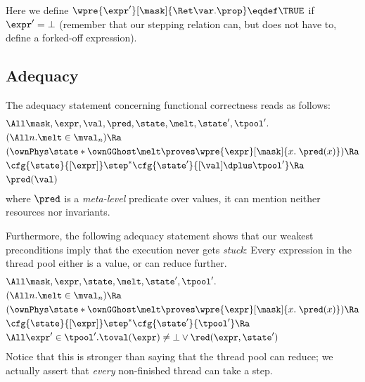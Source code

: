 Here we define $\wpre{\expr'}[\mask]{\Ret\var.\prop} \eqdef \TRUE$ if $\expr' = \bot$ (remember that our stepping relation can, but does not have to, define a forked-off expression).

\subsection{Adequacy}

The adequacy statement concerning functional correctness reads as follows:
\begin{align*}
 &\All \mask, \expr, \val, \pred, \state, \melt, \state', \tpool'.
 \\&(\All n. \melt \in \mval_n) \Ra
 \\&( \ownPhys\state * \ownGGhost\melt \proves \wpre{\expr}[\mask]{x.\; \pred(x)}) \Ra
 \\&\cfg{\state}{[\expr]} \step^\ast
     \cfg{\state'}{[\val] \dplus \tpool'} \Ra
     \\&\pred(\val)
\end{align*}
where $\pred$ is a \emph{meta-level} predicate over values, \ie it can mention neither resources nor invariants.

Furthermore, the following adequacy statement shows that our weakest preconditions imply that the execution never gets \emph{stuck}: Every expression in the thread pool either is a value, or can reduce further.
\begin{align*}
 &\All \mask, \expr, \state, \melt, \state', \tpool'.
 \\&(\All n. \melt \in \mval_n) \Ra
 \\&( \ownPhys\state * \ownGGhost\melt \proves \wpre{\expr}[\mask]{x.\; \pred(x)}) \Ra
 \\&\cfg{\state}{[\expr]} \step^\ast
     \cfg{\state'}{\tpool'} \Ra
     \\&\All\expr'\in\tpool'. \toval(\expr) \neq \bot \lor \red(\expr, \state')
\end{align*}
Notice that this is stronger than saying that the thread pool can reduce; we actually assert that \emph{every} non-finished thread can take a step.




